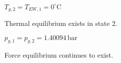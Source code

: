 \( T_{g,2} = T_{EW,1} = 0^\circ \text{C} \)  

Thermal equilibrium exists in state 2.  

\( p_{g,1} = p_{g,2} = 1.40094 \, \text{bar} \)  

Force equilibrium continues to exist.